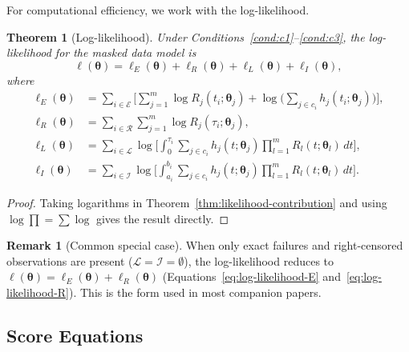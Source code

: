 \documentclass[11pt]{article}
\theoremstyle{definition}
\newtheorem{remark}{Remark}
\theoremstyle{plain}
\newtheorem{theorem}{Theorem}
\renewcommand{\v}[1]{\boldsymbol{#1}}
\newcommand{\btheta}{\v{\theta}}
\begin{document}
For computational efficiency, we work with the log-likelihood.

\begin{theorem}[Log-likelihood]
\label{thm:log-likelihood}
Under Conditions~\ref{cond:c1}--\ref{cond:c3}, the log-likelihood for
the masked data model is
\begin{equation}
\label{eq:log-likelihood}
    \ell(\btheta) = \ell_E(\btheta) + \ell_R(\btheta)
    + \ell_L(\btheta) + \ell_I(\btheta),
\end{equation}
where
\begin{align}
\label{eq:log-likelihood-E}
    \ell_E(\btheta)
    &= \sum_{i \in \mathcal{E}} \biggl[
        \sum_{j=1}^m \log R_j(t_i; \v{\theta}_j)
        + \log\biggl(\sum_{j \in c_i} h_j(t_i; \v{\theta}_j)\biggr)
    \biggr], \\[6pt]
\label{eq:log-likelihood-R}
    \ell_R(\btheta)
    &= \sum_{i \in \mathcal{R}}
        \sum_{j=1}^m \log R_j(\tau_i; \v{\theta}_j), \\[6pt]
\label{eq:log-likelihood-L}
    \ell_L(\btheta)
    &= \sum_{i \in \mathcal{L}}
        \log\biggl[\int_0^{\tau_i}
        \sum_{j \in c_i} h_j(t; \v{\theta}_j)
        \prod_{l=1}^m R_l(t; \v{\theta}_l) \, dt\biggr], \\[6pt]
\label{eq:log-likelihood-I}
    \ell_I(\btheta)
    &= \sum_{i \in \mathcal{I}}
        \log\biggl[\int_{a_i}^{b_i}
        \sum_{j \in c_i} h_j(t; \v{\theta}_j)
        \prod_{l=1}^m R_l(t; \v{\theta}_l) \, dt\biggr].
\end{align}
\end{theorem}

\begin{proof}
Taking logarithms in Theorem~\ref{thm:likelihood-contribution} and
using $\log \prod = \sum \log$ gives the result directly.
\end{proof}

\begin{remark}[Common special case]
\label{rem:common-case}
When only exact failures and right-censored observations are present
($\mathcal{L} = \mathcal{I} = \emptyset$), the log-likelihood reduces to
$\ell(\btheta) = \ell_E(\btheta) + \ell_R(\btheta)$
(Equations~\eqref{eq:log-likelihood-E}
and~\eqref{eq:log-likelihood-R}).
This is the form used in most companion papers.
\end{remark}

\subsection{Score Equations}
\label{sec:score-equations}
\end{document}
